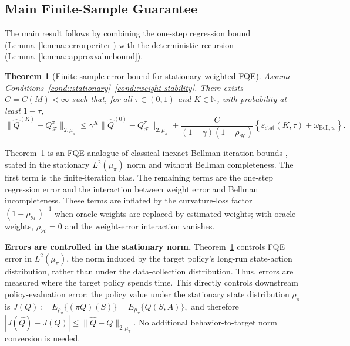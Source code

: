 \documentclass{article}
\theoremstyle{plain}
\newtheorem{theorem}{Theorem}
\theoremstyle{definition}
\theoremstyle{remark}
\begin{document}
\subsection{Main Finite-Sample Guarantee}
\label{sec:theory}

The main result follows by combining the one-step regression bound
(Lemma~\ref{lemma::errorperiter}) with the deterministic recursion
(Lemma~\ref{lemma::approxvaluebound}).

\begin{theorem}[Finite-sample error bound for stationary-weighted FQE]
\label{theorem::main}
Assume Conditions~\ref{cond::stationary}--\ref{cond::weight-stability}. There exists
\(C=C(M)<\infty\)
such that, for all \(\tau\in(0,1)\) and \(K\in\mathbb N\), with probability at
least \(1-\tau\),
\[
\|\widehat Q^{(K)}-Q^\pi_{\mathcal F}\|_{2,\mu_\pi}
\le
\gamma^K\|\widehat Q^{(0)}-Q^\pi_{\mathcal F}\|_{2,\mu_\pi}
+
\frac{C}{(1-\gamma)(1-\rho_{\mathcal H})}
\left\{
\varepsilon_{\mathrm{stat}}(K,\tau)
+\omega_{\mathrm{Bell},w}
\right\}.
\]
\end{theorem}
Theorem~\ref{theorem::main} is an FQE analogue of classical inexact
Bellman-iteration bounds \citep{munos2008finite}, stated in the stationary
\(L^2(\mu_\pi)\) norm and without Bellman completeness. The first term is the
finite-iteration bias. The remaining terms are the one-step regression error and
the interaction between weight error and Bellman incompleteness. These terms are
inflated by the curvature-loss factor \((1-\rho_{\mathcal H})^{-1}\) when
oracle weights are replaced by estimated weights; with oracle weights,
\(\rho_{\mathcal H}=0\) and the weight-error interaction vanishes.

 

\textbf{Errors are controlled in the stationary norm.}
Theorem~\ref{theorem::main} controls FQE error in \(L^2(\mu_\pi)\), the norm
induced by the target policy's long-run state-action distribution, rather than
under the data-collection distribution. Thus, errors are measured where the
target policy spends time. This directly controls downstream policy-evaluation
error: the policy value under the stationary state distribution \(\rho_\pi\) is $   J(Q):=E_{\rho_\pi}\{(\pi Q)(S)\}
    = E_{\mu_\pi}\{Q(S,A)\},$ and therefore $  |J(\widehat Q)-J(Q)|
    \le
    \|\widehat Q-Q\|_{2,\mu_\pi}.$
No additional behavior-to-target norm conversion is needed.
\end{document}
